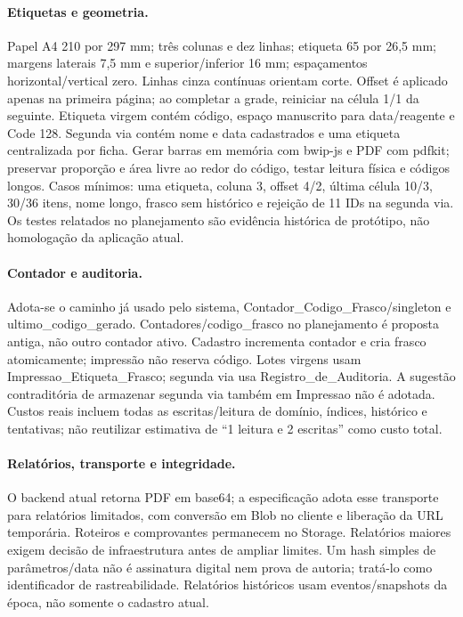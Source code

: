 \paragraph{Etiquetas e geometria.}
Papel A4 210 por 297 mm; três colunas e dez linhas; etiqueta 65 por 26,5 mm; margens laterais 7,5 mm e superior/inferior 16 mm; espaçamentos horizontal/vertical zero. Linhas cinza contínuas orientam corte. Offset é aplicado apenas na primeira página; ao completar a grade, reiniciar na célula 1/1 da seguinte. Etiqueta virgem contém código, espaço manuscrito para data/reagente e Code 128. Segunda via contém nome e data cadastrados e uma etiqueta centralizada por ficha. Gerar barras em memória com bwip-js e PDF com pdfkit; preservar proporção e área livre ao redor do código, testar leitura física e códigos longos. Casos mínimos: uma etiqueta, coluna 3, offset 4/2, última célula 10/3, 30/36 itens, nome longo, frasco sem histórico e rejeição de 11 IDs na segunda via. Os testes relatados no planejamento são evidência histórica de protótipo, não homologação da aplicação atual.

\paragraph{Contador e auditoria.}
Adota-se o caminho já usado pelo sistema, Contador\_Codigo\_Frasco/singleton e ultimo\_codigo\_gerado. Contadores/codigo\_frasco no planejamento é proposta antiga, não outro contador ativo. Cadastro incrementa contador e cria frasco atomicamente; impressão não reserva código. Lotes virgens usam Impressao\_Etiqueta\_Frasco; segunda via usa Registro\_de\_Auditoria. A sugestão contraditória de armazenar segunda via também em Impressao não é adotada. Custos reais incluem todas as escritas/leitura de domínio, índices, histórico e tentativas; não reutilizar estimativa de ``1 leitura e 2 escritas'' como custo total.

\paragraph{Relatórios, transporte e integridade.}
O backend atual retorna PDF em base64; a especificação adota esse transporte para relatórios limitados, com conversão em Blob no cliente e liberação da URL temporária. Roteiros e comprovantes permanecem no Storage. Relatórios maiores exigem decisão de infraestrutura antes de ampliar limites. Um hash simples de parâmetros/data não é assinatura digital nem prova de autoria; tratá-lo como identificador de rastreabilidade. Relatórios históricos usam eventos/snapshots da época, não somente o cadastro atual.

